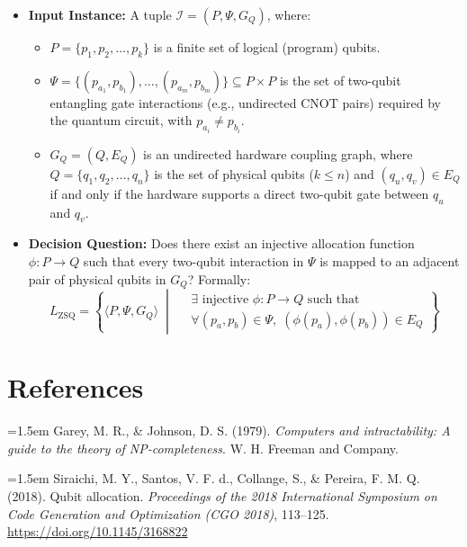\documentclass[11pt, a4paper]{article}
\begin{document}
\begin{itemize}
    \item \textbf{Input Instance:} A tuple $\mathcal{I} = (P, \Psi, G_Q)$, where:
    \begin{itemize}
        \item $P = \{p_1, p_2, \dots, p_k\}$ is a finite set of logical (program) qubits.
        \item $\Psi = \{(p_{a_1}, p_{b_1}), \dots, (p_{a_m}, p_{b_m})\} \subseteq P \times P$ is the set of two-qubit entangling gate interactions (e.g., undirected CNOT pairs) required by the quantum circuit, with $p_{a_i} \neq p_{b_i}$.
        \item $G_Q = (Q, E_Q)$ is an undirected hardware coupling graph, where $Q = \{q_1, q_2, \dots, q_n\}$ is the set of physical qubits ($k \le n$) and $(q_u, q_v) \in E_Q$ if and only if the hardware supports a direct two-qubit gate between $q_u$ and $q_v$.
    \end{itemize}
    \item \textbf{Decision Question:} Does there exist an injective allocation function $\phi: P \to Q$ such that every two-qubit interaction in $\Psi$ is mapped to an adjacent pair of physical qubits in $G_Q$? Formally:
    \[
    L_{\text{ZSQ}} = \left\{ \langle P, \Psi, G_Q \rangle \;\middle|\;
    \begin{aligned}
        &\exists \text{ injective } \phi: P \to Q \text{ such that } \\
        &\forall (p_a, p_b) \in \Psi,\; (\phi(p_a), \phi(p_b)) \in E_Q
    \end{aligned}
    \right\}
    \]
\end{itemize}

\section{References}

\noindent\hangindent=1.5em
Garey, M. R., \& Johnson, D. S. (1979). \textit{Computers and intractability: A guide to the theory of NP-completeness}. W. H. Freeman and Company.\par

\noindent\hangindent=1.5em
Siraichi, M. Y., Santos, V. F. d., Collange, S., \& Pereira, F. M. Q. (2018). Qubit allocation. \textit{Proceedings of the 2018 International Symposium on Code Generation and Optimization (CGO 2018)}, 113--125. \url{https://doi.org/10.1145/3168822}\par
\end{document}
